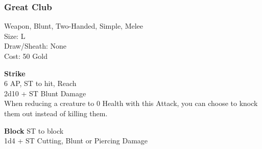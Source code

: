 \subsubsection{Great Club}\label{weapon:greatClub}
Weapon, Blunt, Two-Handed, Simple, Melee\\
Size: L\\
Draw/Sheath: None\\
Cost: 50 Gold

\textbf{Strike} \\
6 AP, ST to hit,  Reach\\
2d10 + \texttimes ST Blunt Damage\\
When reducing a creature to 0 Health with this Attack, you can choose to knock them out instead of killing them.

\textbf{Block}
ST to block\\
1d4 + \texttimes ST Cutting, Blunt or Piercing Damage

